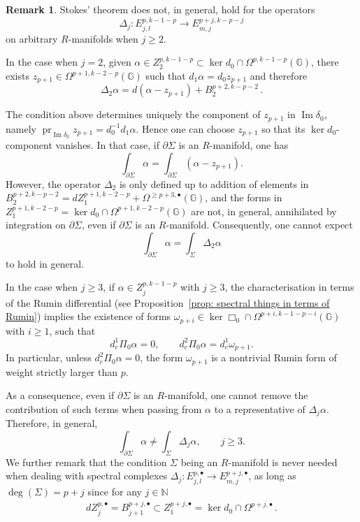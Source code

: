 \documentclass[dvipsnames]{amsart}
\theoremstyle{definition}
\newtheorem{remark}[theorem]{Remark}
\theoremstyle{definition}
\numberwithin{equation}{section}
\newcommand{\N}{\mathbb{N}}
\begin{document}
\begin{remark}\label{rmk: spectral stokes no on R manifolds}
    Stokes' theorem does not, in general, hold for the operators
\[
\Delta_j\colon E_{j,l}^{p,k-1-p}\longrightarrow E_{m,j}^{p+j,k-p-j}
\]
on arbitrary $R$-manifolds when $j\ge 2$.

In the case when $j=2$, given $\alpha\in Z_2^{p,k-1-p}\subset \ker d_0\cap\Omega^{p,k-1-p}(\mathbb G)$, there exists $z_{p+1}\in\Omega^{p+1,k-2-p}(\mathbb G)$ such that $d_1\alpha=d_0z_{p+1}$
and therefore
\[
\Delta_2\alpha
=
d(\alpha - z_{p+1})
+
B_2^{p+2,k-p-2}\,.
\]

The condition above determines uniquely the component of $z_{p+1}$ in $\operatorname{Im}\delta_0$, namely $\operatorname{pr}_{\operatorname{Im}\delta_0} z_{p+1} = d_0^{-1} d_1 \alpha$.
Hence one can choose $z_{p+1}$ so that its $\ker d_0$-component vanishes. In that case, if $\partial\Sigma$ is an $R$-manifold, one has
\[
\int_{\partial\Sigma} \alpha
=
\int_{\partial\Sigma} (\alpha - z_{p+1}).
\]
However, the operator $\Delta_2$ is only defined up to addition of elements in
$B_2^{p+2,k-p-2}
=
dZ_1^{p+1,k-2-p}
+
\Omega^{\ge p+3,\bullet}(\mathbb G)$,
and the forms in $Z_1^{p+1,k-2-p}=\ker d_0\cap\Omega^{p+1,k-2-p}(\mathbb G)$ are not, in general, annihilated by integration on $\partial\Sigma$, even if $\partial\Sigma$ is an $R$-manifold. Consequently, one cannot expect
\[
\int_{\partial\Sigma}\alpha = \int_\Sigma \Delta_2\alpha
\]
to hold in general.

In the case when $j\ge 3$, if $\alpha\in Z_j^{p,k-1-p}$ with $j\ge 3$, the characterisation in terms of the Rumin differential (see Proposition~\ref{prop: spectral things in terms of Rumin}) implies the existence of forms $\omega_{p+i}\in \ker\Box_0\cap\Omega^{p+i,k-1-p-i}(\mathbb G)$ with $i\ge 1$,
such that
\[
d_c^1\Pi_0\alpha = 0,
\qquad
d_c^2\Pi_0\alpha = d_c^1 \omega_{p+1}.
\]
In particular, unless $d_c^2\Pi_0\alpha=0$, the form $\omega_{p+1}$ is a nontrivial Rumin form of weight strictly larger than $p$.

As a consequence, even if $\partial\Sigma$ is an $R$-manifold, one cannot remove the contribution of such terms when passing from $\alpha$ to a representative of $\Delta_j\alpha$. Therefore, in general,
\[
\int_{\partial\Sigma}\alpha \neq \int_\Sigma \Delta_j\alpha,
\qquad j\ge 3.
\]
We further remark that the condition $\Sigma$ being an $R$-manifold is never needed when dealing with spectral complexes $\Delta_j\colon E_{j,l}^{p,\bullet}\longrightarrow E_{m,j}^{p+j,\bullet}$, as long as $\operatorname{deg}(\Sigma)=p+j$ since for any $j\in\N$
    \begin{align*}
        d Z_j^{p,\bullet}=B_{j+1}^{p+j,\bullet}\subset Z_1^{p+j,\bullet}=\ker d_0\cap\Omega^{p+j,\bullet}\,.
    \end{align*}


\end{remark}
\end{document}
